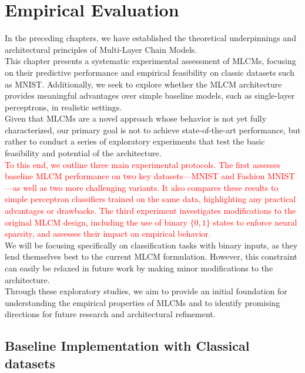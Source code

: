 \documentclass[a4paper,12pt]{report}
\begin{document}
\chapter{Empirical Evaluation}
In the preceding chapters, we have established the theoretical underpinnings and 
architectural principles of Multi-Layer Chain Models. \\
This chapter presents a systematic experimental assessment of MLCMs, focusing on their 
predictive performance and empirical feasibility on classic datasets such as MNIST. 
Additionally, we seek to explore whether the MLCM architecture provides meaningful 
advantages over simple baseline models, such as single-layer perceptrons, in 
realistic settings. \\
Given that MLCMs are a novel approach whose behavior is not yet fully 
characterized, our primary goal is not to achieve state-of-the-art performance, 
but rather to conduct a series of exploratory experiments that test the basic 
feasibility and potential of the architecture. \\
\textcolor{red}{To this end, we outline three main experimental protocols. The first 
assesses baseline MLCM performance on two key datasets—MNIST and Fashion MNIST—as 
well as two more challenging variants. It also compares these results to simple 
perceptron classifiers trained on the same data, highlighting any practical 
advantages or drawbacks. The third experiment 
investigates modifications to the original MLCM design, including the use of binary 
\(\{0,1\}\) states to enforce neural sparsity, and assesses their impact on empirical 
behavior. \\}
We will be focusing specifically on classification tasks with binary inputs, as they 
lend themselves best to the current MLCM formulation. However, this constraint can 
easily be relaxed in future work by making minor modifications to the architecture. \\
Through these exploratory studies, we aim to provide an initial foundation for 
understanding the empirical properties of MLCMs and to identify promising directions 
for future research and architectural refinement.

\section{Baseline Implementation with Classical datasets}
\end{document}
